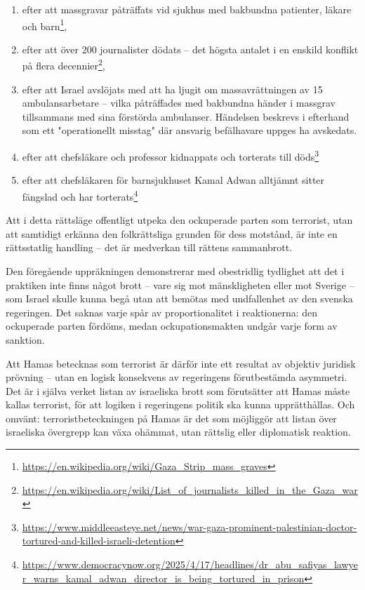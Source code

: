 \begin{enumerate}
\item efter att massgravar påträffats vid sjukhus med bakbundna patienter, läkare och barn\footnote{\url{https://en.wikipedia.org/wiki/Gaza_Strip_mass_graves}},
\item efter att över 200 journalister dödats – det högsta antalet i en enskild konflikt på flera decennier\footnote{\url{https://en.wikipedia.org/wiki/List_of_journalists_killed_in_the_Gaza_war}},
\item efter att Israel avslöjats med att ha ljugit om massavrättningen av 15 ambulansarbetare – vilka påträffades med bakbundna händer i massgrav tillsammans med sina förstörda ambulanser. Händelsen beskrevs i efterhand som ett "operationellt misstag" där ansvarig befälhavare uppges ha avskedats.
\item efter att chefsläkare och professor kidnappats och torterats till döds\footnote{\url{https://www.middleeasteye.net/news/war-gaza-prominent-palestinian-doctor-tortured-and-killed-israeli-detention}}
\item efter att chefsläkaren för barnsjukhuset Kamal Adwan alltjämnt sitter fängslad och har torterats\footnote{\url{https://www.democracynow.org/2025/4/17/headlines/dr_abu_safiyas_lawyer_warns_kamal_adwan_director_is_being_tortured_in_prison}}
\end{enumerate}


Att i detta rättsläge offentligt utpeka den ockuperade parten som terrorist, utan att samtidigt erkänna den folkrättsliga grunden för dess motstånd, är inte en rättsstatlig handling – det är medverkan till rättens sammanbrott.

Den föregående uppräkningen demonstrerar med obestridlig tydlighet att det i praktiken inte finns något brott – vare sig mot mänskligheten eller mot Sverige – som Israel skulle kunna begå utan att bemötas med undfallenhet av den svenska regeringen. Det saknas varje spår av proportionalitet i reaktionerna: den ockuperade parten fördöms, medan ockupationsmakten undgår varje form av sanktion.

Att Hamas betecknas som terrorist är därför inte ett resultat av objektiv juridisk prövning – utan en logisk konsekvens av regeringens förutbestämda asymmetri. Det är i själva verket listan av israeliska brott som förutsätter att Hamas måste kallas terrorist, för att logiken i regeringens politik ska kunna upprätthållas. Och omvänt: terroristbeteckningen på Hamas är det som möjliggör att listan över israeliska övergrepp kan växa ohämmat, utan rättslig eller diplomatisk reaktion.

